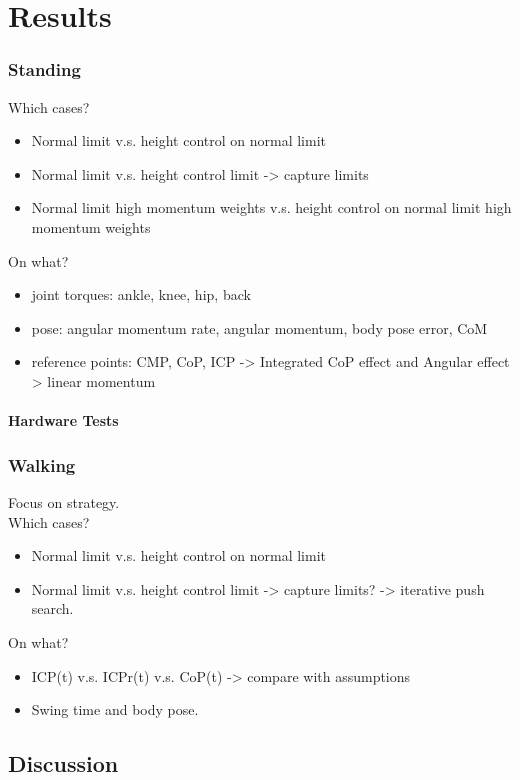 \chapter{Results}
\subsection{Standing}
Which cases?
\begin{itemize}
	\item Normal limit v.s. height control on normal limit
	\item Normal limit v.s. height control limit -> capture limits
	\item Normal limit high momentum weights v.s. height control on normal limit high momentum weights
\end{itemize}

On what?
\begin{itemize}
	\item joint torques: ankle, knee, hip, back
	\item pose: angular momentum rate, angular momentum, body pose error, CoM
	\item reference points: CMP, CoP, ICP -> Integrated CoP effect and Angular effect > linear momentum
\end{itemize}
\subsubsection{Hardware Tests}
\subsection{Walking}
Focus on strategy.\\
Which cases? 
\begin{itemize}
	\item Normal limit v.s. height control on normal limit
	\item Normal limit v.s. height control limit -> capture limits? -> iterative push search.
\end{itemize}

On what?
\begin{itemize}
	\item ICP(t) v.s. ICPr(t) v.s. CoP(t) -> compare with assumptions
	\item Swing time and body pose.
\end{itemize}


\section{Discussion}
